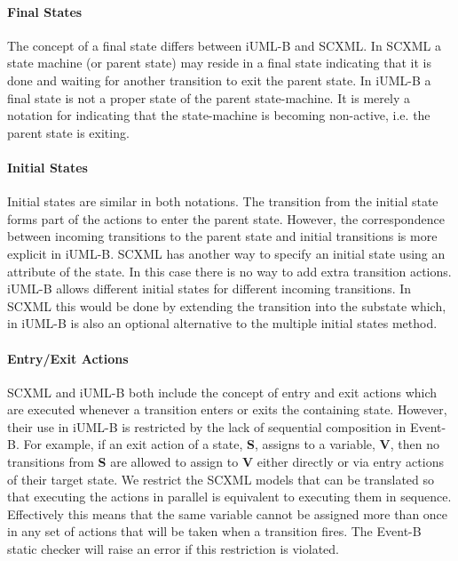 \paragraph{Final States}
The concept of a final state differs between iUML-B and SCXML. 
In SCXML a state machine (or parent state) may reside in a final state indicating that it is done and waiting for another transition to exit the parent state. In iUML-B a final state is not a proper state of the parent state-machine. 
It is merely a notation for indicating that the state-machine is becoming non-active, i.e. the parent state is exiting. 
\vspace{-0.25cm}

\paragraph{Initial States}
Initial states are similar in both notations. 
The transition from the initial state forms part of the actions to enter the parent state. 
However, the correspondence between incoming transitions to the parent state and initial transitions is more explicit in iUML-B. 
SCXML has another way to specify an initial state using an attribute of the state.
 In this case there is no way to add extra transition actions.
iUML-B allows different initial states for different incoming transitions. 
In SCXML this would be done by extending the transition into the substate which, in iUML-B is also an optional alternative to the multiple initial states method.
\vspace{-0.25cm}

\paragraph{Entry/Exit Actions}
SCXML and iUML-B both include the concept of entry and exit actions which are executed whenever a transition enters or exits the containing state. 
However, their use in iUML-B is restricted by the lack of sequential composition in Event-B. 
For example, if an exit action of a state, \textbf{S}, assigns to a variable, \textbf{V}, then no transitions from \textbf{S} are allowed to assign to \textbf{V} either directly or via entry actions of their target state.
We restrict the SCXML models that can be translated so that executing the actions in parallel is equivalent to executing them in sequence.
Effectively this means that the same variable cannot be assigned more than once in any set of actions that will be taken when a transition fires. 
The Event-B static checker will raise an error if this restriction is violated.
\vspace{-0.25cm}

